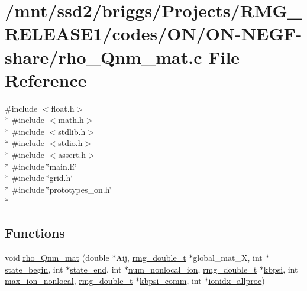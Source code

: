 \hypertarget{_o_n_2_o_n-_n_e_g_f-share_2rho___qnm__mat_8c}{\section{/mnt/ssd2/briggs/\-Projects/\-R\-M\-G\-\_\-\-R\-E\-L\-E\-A\-S\-E1/codes/\-O\-N/\-O\-N-\/\-N\-E\-G\-F-\/share/rho\-\_\-\-Qnm\-\_\-mat.c File Reference}
\label{_o_n_2_o_n-_n_e_g_f-share_2rho___qnm__mat_8c}
}
{\ttfamily \#include $<$float.\-h$>$}\\*
{\ttfamily \#include $<$math.\-h$>$}\\*
{\ttfamily \#include $<$stdlib.\-h$>$}\\*
{\ttfamily \#include $<$stdio.\-h$>$}\\*
{\ttfamily \#include $<$assert.\-h$>$}\\*
{\ttfamily \#include \char`\"{}main.\-h\char`\"{}}\\*
{\ttfamily \#include \char`\"{}grid.\-h\char`\"{}}\\*
{\ttfamily \#include \char`\"{}prototypes\-\_\-on.\-h\char`\"{}}\\*
\subsection*{Functions}
\begin{DoxyCompactItemize}
\item 
void \hyperlink{_o_n_2_o_n-_n_e_g_f-share_2rho___qnm__mat_8c_acf75bf01ea3e80da5aad006baabe375c}{rho\-\_\-\-Qnm\-\_\-mat} (double $\ast$Aij, \hyperlink{rmgtypes_8h_aaa16921c14f121c56eaa42390a340db8}{rmg\-\_\-double\-\_\-t} $\ast$global\-\_\-mat\-\_\-\-X, int $\ast$\hyperlink{overlap_8h_ac1e3596fc6bf65483bbbd9494b002e17}{state\-\_\-begin}, int $\ast$\hyperlink{overlap_8h_addfc8c8c13b8a2ccb81fb7957b1474b2}{state\-\_\-end}, int $\ast$\hyperlink{overlap_8h_acc14911e05b3f821815a5c666954414c}{num\-\_\-nonlocal\-\_\-ion}, \hyperlink{rmgtypes_8h_aaa16921c14f121c56eaa42390a340db8}{rmg\-\_\-double\-\_\-t} $\ast$\hyperlink{overlap_8h_aa5c5ccb14e2d6e1303536c0d5b8f10e6}{kbpsi}, int \hyperlink{overlap_8h_abcaca526c7f03c5fe2eebcc6076cdd19}{max\-\_\-ion\-\_\-nonlocal}, \hyperlink{rmgtypes_8h_aaa16921c14f121c56eaa42390a340db8}{rmg\-\_\-double\-\_\-t} $\ast$\hyperlink{overlap_8h_aecee237a23b1e317a41c209a9b9ffa1f}{kbpsi\-\_\-comm}, int $\ast$\hyperlink{overlap_8h_ae5e305c1dbcd0c30c5d5ce69e733150a}{ionidx\-\_\-allproc})
\end{DoxyCompactItemize}


